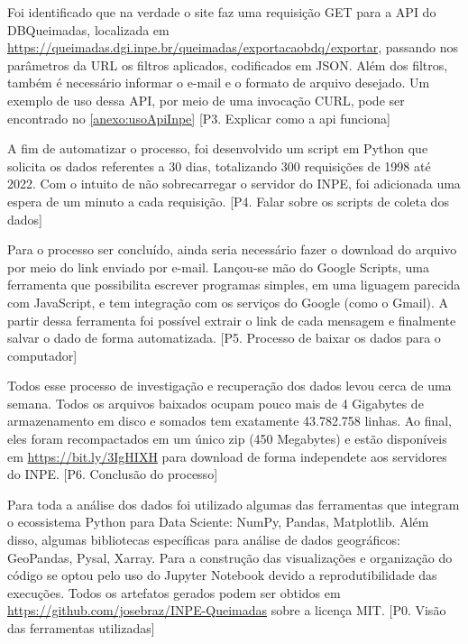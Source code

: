 \documentclass[cic,tc]{iiufrgs}
\begin{document}
Foi identificado que na verdade o site faz uma requisição GET para a API do 
DBQueimadas, localizada em 
\url{https://queimadas.dgi.inpe.br/queimadas/exportacaobdq/exportar}, 
passando nos parâmetros da URL os filtros aplicados, codificados em JSON.
Além dos filtros, também é necessário informar o e-mail e o formato de arquivo
desejado. Um exemplo de uso dessa API, por meio de uma invocação CURL, pode 
ser encontrado no \ref{anexo:usoApiInpe} [P3. Explicar como a api funciona]

A fim de automatizar o processo, foi desenvolvido um script em Python que 
solicita os dados referentes a 30 dias, totalizando 300 requisições de 1998 
até 2022. Com 
o intuito de não sobrecarregar o servidor do INPE, foi adicionada uma espera de 
um minuto a cada requisição. [P4. Falar sobre os scripts de coleta dos dados] \par

Para o processo ser concluído, ainda seria 
necessário fazer o download do arquivo por meio do link enviado por e-mail.
Lançou-se mão do Google Scripts, uma ferramenta que possibilita escrever 
programas simples, em uma liguagem parecida com JavaScript, e tem 
integração com os serviços do Google (como o Gmail). A partir dessa ferramenta
foi possível extrair o link de cada mensagem e finalmente salvar o dado
de forma automatizada. [P5. Processo de baixar os dados para o computador] \par

Todos esse processo de investigação e recuperação dos dados levou cerca de uma 
semana. Todos os arquivos baixados ocupam pouco mais de 4 Gigabytes de 
armazenamento em disco e somados tem exatamente 43.782.758 linhas. Ao final, eles 
foram recompactados em um único zip (450 Megabytes) e estão disponíveis 
em \url{https://bit.ly/3IgHIXH} para download de forma independete aos servidores 
do INPE. [P6. Conclusão do processo] \par


Para toda a análise dos dados foi utilizado algumas das ferramentas que integram o 
ecossistema Python para Data Sciente: NumPy, Pandas, Matplotlib. Além disso, 
algumas bibliotecas específicas para análise de dados geográficos: GeoPandas, 
Pysal, Xarray. Para a construção das visualizações e organização do código se 
optou pelo uso do Jupyter Notebook devido a reprodutibilidade das execuções. 
Todos os artefatos gerados podem ser obtidos em 
\url{https://github.com/josebraz/INPE-Queimadas} sobre a licença MIT. 
[P0. Visão das ferramentas utilizadas]\par
\end{document}
